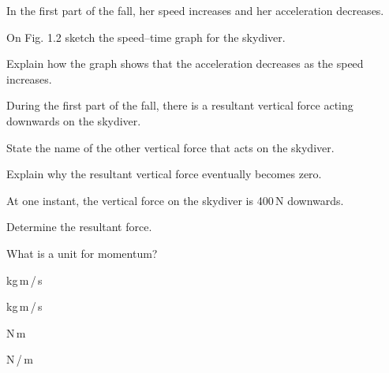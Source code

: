 
In the first part of the fall, her speed increases and her acceleration decreases.

\begin{parts}
  \item On Fig. 1.2 sketch the speed--time graph for the skydiver.

  \markright{[2]}

  \item Explain how the graph shows that the acceleration decreases as the speed increases.

  \item During the first part of the fall, there is a resultant vertical force
  acting downwards on the skydiver.
  \begin{subparts}
    \item State the name of the other vertical force that acts on the skydiver.

    \item Explain why the resultant vertical force eventually becomes zero.
  \end{subparts}

  \item At one instant, the vertical force on the skydiver is 400\,N downwards.

  Determine the resultant force.
\end{parts}
\total

What is a unit for momentum?

\begin{choices}
  \item kg\,m\,/\,s
  \item kg\,m\,/\,s
  \item N\,m
  \item N\,/\,m
\end{choices}


